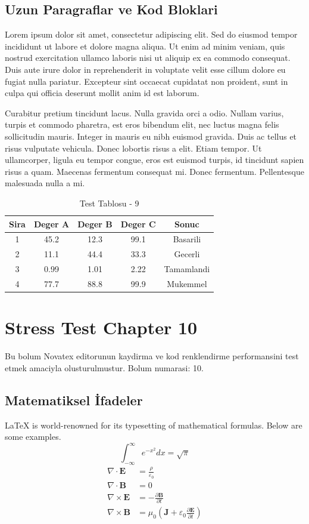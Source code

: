 \documentclass[12pt,a4paper]{article}
\begin{document}
\subsection{Uzun Paragraflar ve Kod Bloklari}
Lorem ipsum dolor sit amet, consectetur adipiscing elit. Sed do eiusmod tempor incididunt ut labore et dolore magna aliqua. Ut enim ad minim veniam, quis nostrud exercitation ullamco laboris nisi ut aliquip ex ea commodo consequat. Duis aute irure dolor in reprehenderit in voluptate velit esse cillum dolore eu fugiat nulla pariatur. Excepteur sint occaecat cupidatat non proident, sunt in culpa qui officia deserunt mollit anim id est laborum.

Curabitur pretium tincidunt lacus. Nulla gravida orci a odio. Nullam varius, turpis et commodo pharetra, est eros bibendum elit, nec luctus magna felis sollicitudin mauris. Integer in mauris eu nibh euismod gravida. Duis ac tellus et risus vulputate vehicula. Donec lobortis risus a elit. Etiam tempor. Ut ullamcorper, ligula eu tempor congue, eros est euismod turpis, id tincidunt sapien risus a quam. Maecenas fermentum consequat mi. Donec fermentum. Pellentesque malesuada nulla a mi.

\begin{table}[h!]
\centering
\begin{tabular}{|c|c|c|c|c|}
\hline
\textbf{Sira} & \textbf{Deger A} & \textbf{Deger B} & \textbf{Deger C} & \textbf{Sonuc} \\
\hline
1 & 45.2 & 12.3 & 99.1 & Basarili \\
2 & 11.1 & 44.4 & 33.3 & Gecerli \\
3 & 0.99 & 1.01 & 2.22 & Tamamlandi \\
4 & 77.7 & 88.8 & 99.9 & Mukemmel \\
\hline
\end{tabular}
\caption{Test Tablosu - 9}
\end{table}

\newpage
\section{Stress Test Chapter 10}
Bu bolum Novatex editorunun kaydirma ve kod renklendirme performansini test etmek amaciyla olusturulmustur. Bolum numarasi: 10.

\subsection{Matematiksel İfadeler}
\LaTeX{} is world-renowned for its typesetting of mathematical formulas. Below are some examples.
\begin{equation}
\int_{-\infty}^{\infty} e^{-x^2} dx = \sqrt{\pi}
\end{equation}
\begin{align}
\nabla \cdot \mathbf{E} &= \frac{\rho}{\varepsilon_0} \\
\nabla \cdot \mathbf{B} &= 0 \\
\nabla \times \mathbf{E} &= -\frac{\partial \mathbf{B}}{\partial t} \\
\nabla \times \mathbf{B} &= \mu_0\left(\mathbf{J} + \varepsilon_0 \frac{\partial \mathbf{E}}{\partial t}\right)
\end{align}
\end{document}
